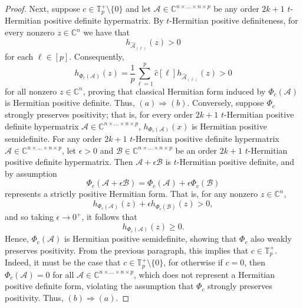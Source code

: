 \documentclass[11pt]{article}
\begin{document}
\begin{proof}
    Next, suppose $c\in \mathbb{T}_p^+\setminus \{0\}$ and let $\mathcal{A}\in \mathbb{C}^{n\times\dots\times n\times p}$ be any order $2k+1$ $t$-Hermitian positive definite hypermatrix. By $t$-Hermitian positive definiteness, for every nonzero $z\in \mathbb{C}^n$ we have that 
    \[h_{\widehat{\mathcal{A}}_{(\ell)}}(z) > 0\]
    for each $\ell\in [p]$. Consequently, 
    \[h_{\Phi_c(\mathcal{A})}(z) = \frac{1}{p}\sum\limits_{\ell=1}^p\widehat{c}[\ell]h_{\widehat{\mathcal{A}}_{(\ell)}}(z)>0\]
    for all nonzero $z\in \mathbb{C}^n$, proving that classical Hermitian form induced by $\Phi_c(\mathcal{A})$ is Hermitian positive definite. Thus, $(a)\Rightarrow (b)$. Conversely, suppose $\Phi_c$ strongly preserves positivity; that is, for every order $2k+1$ $t$-Hermitian positive definite hypermatrix $\mathcal{A}\in \mathbb{C}^{n\times\dots\times n\times p}$, $h_{\Phi_c(\mathcal{A})}(x)$ is Hermitian positive semidefinite. For any order $2k+1$ $t$-Hermitian positive definite hypermatrix $\mathcal{A}\in \mathbb{C}^{n\times\dots\times n\times p}$, let $\epsilon > 0$ and $\mathcal{B}\in \mathbb{C}^{n\times\dots\times n\times p}$ be an order $2k+1$ $t$-Hermitian positive definite hypermatrix. Then $\mathcal{A}+\epsilon\mathcal{B}$ is $t$-Hermitian positive definite, and by assumption 
    \[\Phi_c(\mathcal{A}+\epsilon\mathcal{B}) = \Phi_c(\mathcal{A})+\epsilon\Phi_c(\mathcal{B})\]
    represents a strictly positive Hermitian form. That is, for any nonzero $z\in \mathbb{C}^n$, 
    \[h_{\Phi_c(\mathcal{A})}(z)+\epsilon h_{\Phi_c(\mathcal{B})}(z) > 0,\]
    and so taking $\epsilon\rightarrow 0^+$, it follows that 
    \[h_{\Phi_c(\mathcal{A})}(z)\geq 0.\]
    Hence, $\Phi_c(\mathcal{A})$ is Hermitian positive semidefinite, showing that $\Phi_c$ also weakly preserves positivity. From the previous paragraph, this implies that $c\in \mathbb{T}_p^+$. Indeed, it must be the case that $c\in \mathbb{T}_p^+\setminus \{0\}$, for otherwise if $c=0$, then $\Phi_c(\mathcal{A})=0$ for all $\mathcal{A}\in \mathbb{C}^{n\times\dots\times n\times p}$, which does not represent a Hermitian positive definite form, violating the assumption that $\Phi_c$ strongly preserves positivity. Thus, $(b)\Rightarrow (a)$. 
\end{proof}
\end{document}
